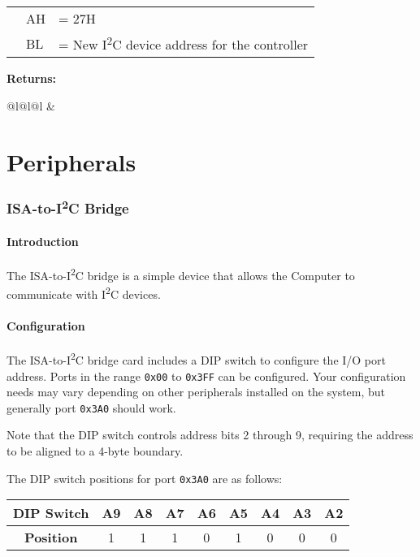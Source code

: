 \documentclass[twoside,10pt,letterpaper]{refart}
\newcommand{\itwoc}{I\textsuperscript{2}C}
\begin{document}
\begin{tabular}{@{\hspace{2em}}l@{}l@{\hspace{2em}}l}
{} & AH & = 27H \\
{} & BL & = New \itwoc{} device address for the controller
\end{tabular}

\textbf{Returns:}

\begin{tabular}{@{\hspace{2em}}l@{}l@{\hspace{2em}}l}
{} & 
\end{tabular}

\newpage

\part{Peripherals}

\section{ISA-to-\itwoc{} Bridge}

\subsection{Introduction}
The ISA-to-\itwoc{} bridge is a simple device that allows the  Computer to communicate
with \itwoc{} devices.

\subsection{Configuration}
The ISA-to-\itwoc{} bridge card includes a DIP switch to configure the I/O port address.
Ports in the range \texttt{0x00} to \texttt{0x3FF} can be configured. Your configuration needs may
vary depending on other peripherals installed on the system, but generally port \texttt{0x3A0} should
work.

Note that the DIP switch controls address bits 2 through 9, requiring the address to be aligned to
a 4-byte boundary.

The DIP switch positions for port \texttt{0x3A0} are as follows:

\begin{center}
    \begin{tabular}{ c|c|c|c|c|c|c|c|c }
        \textbf{DIP Switch} & A9 & A8 & A7 & A6 & A5 & A4 & A3 & A2 \\
        \hline
        \textbf{Position} & 1 & 1 & 1 & 0 & 1 & 0 & 0 & 0
    \end{tabular}
\end{center}
\end{document}
